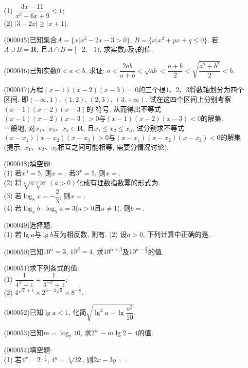 (1) $\dfrac{3x-11}{x^2-6x+9}\le 1$;\\
(2) $|3-2x| \ge |x+1|$.
\item (000045)已知集合$A=\{x|x^2-2x-3>0\}$, $B=\{x|x^2+px+q\le 0\}$. 若$A\cup B=\mathbf{R}$, 且$A\cap B=[-2,-1)$, 求实数$p$及$q$的值.
\item (000046)已知实数$0<a<b$, 求证: $a<\dfrac{2ab}{a+b}<\sqrt{ab}<\dfrac{a+b}{2}<\sqrt{\dfrac{a^2+b^2}{2}}<b$.
\item (000047)方程$(x-1)(x-2)(x-3)=0$的三个根$1$、$2$、$3$将数轴划分为四个区间, 即$(-\infty, 1)$, $(1, 2)$, $(2, 3)$, $(3, +\infty)$. 试在这四个区间上分别考察$(x-1)(x-2)(x-3)$的
符号, 从而得出不等式$(x-1)(x-2)(x-3)>0$与$(x-1)(x-2)(x-3)<0$的解集.\\
一般地, 对$x_1$、$x_2$、$x_3\in \mathbf{R}$, 且$x_1\le x_2\le x_3$, 试分别求不等式$(x-x_1)(x-x_2)(x-x_3)>0$与$(x-x_1)(x-x_2)(x-x_3)<0$的解集(提示: $x_1$、$x_2$、$x_3$相互之间可能相等, 需要分情况讨论).
\item (000048)填空题:\\
(1) 若$x^3=5$, 则$x=$; 若$3^x=5$, 则$x=$.\\
(2) 将$\sqrt[4]{a\sqrt[3]{a}} \ (a>0)$化成有理数指数幂的形式为.\\
(3) 若$\log_8x=-\dfrac 23$, 则$x=$.\\
(4) 若$\log_a b\cdot \log_5 a=3$($a>0$且$a\ne 1$), 则$b=$.
\item (000049)选择题:\\
(1) 若$\lg a$与$\lg b$互为相反数, 则有.
(2) 设$a>0$, 下列计算中正确的是.
\item (000050)已知$10^\alpha=3$, $10^\beta=4$. 求$10^{\alpha+\beta}$及$10^{\alpha-\frac{\beta}2}$的值.
\item (000051)求下列各式的值:\\
(1) $\dfrac{1}{4^x+1}+\dfrac{1}{4^{-x}+1}$;\\
(2) $4^{\sqrt 2+1}\times 2^{3-2\sqrt 2}\times 8^{-\frac 23}$.
\item (000052)已知$\lg a<1$, 化简$\sqrt{\lg^2 a-\lg \dfrac{a^2}{10}}$.
\item (000053)已知$m=\log_2 10$, 求$2^m-m\lg 2-4$的值.
\item (000054)填空题:\\
(1) 若$4^x=2^{-\frac{1}{2}}$, $4^y=\sqrt[3]{32}$, 则$2x-3y=$.\\
